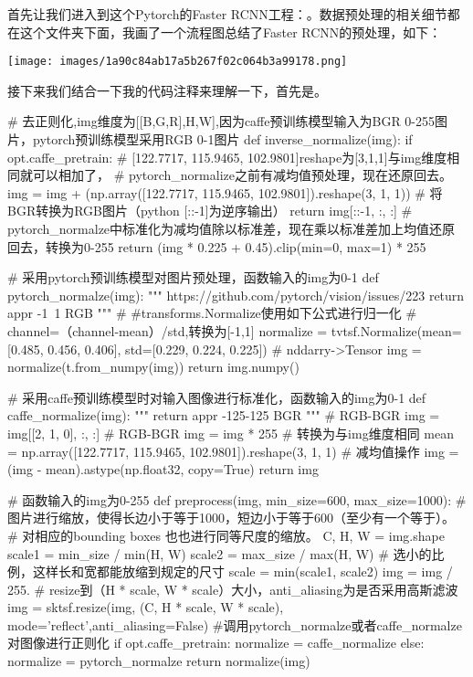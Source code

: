 \documentclass{article}
\begin{document}
首先让我们进入到这个Pytorch的Faster RCNN工程：。数据预处理的相关细节都在这个文件夹下面，我画了一个流程图总结了Faster RCNN的预处理，如下：




\begin{center}
\vspace{\baselineskip}\texttt{[image: images/1a90c84ab17a5b267f02c064b3a99178.png]}\vspace{\baselineskip}
\end{center}


接下来我们结合一下我的代码注释来理解一下，首先是。


\begin{langbox}[Py]
# 去正则化,img维度为[[B,G,R],H,W],因为caffe预训练模型输入为BGR 0-255图片，pytorch预训练模型采用RGB 0-1图片
def inverse_normalize(img):
    if opt.caffe_pretrain:
        # [122.7717, 115.9465, 102.9801]reshape为[3,1,1]与img维度相同就可以相加了，
        # pytorch_normalize之前有减均值预处理，现在还原回去。
        img = img + (np.array([122.7717, 115.9465, 102.9801]).reshape(3, 1, 1))
        # 将BGR转换为RGB图片（python [::-1]为逆序输出）
        return img[::-1, :, :]
    # pytorch_normalze中标准化为减均值除以标准差，现在乘以标准差加上均值还原回去，转换为0-255
    return (img * 0.225 + 0.45).clip(min=0, max=1) * 255

# 采用pytorch预训练模型对图片预处理，函数输入的img为0-1
def pytorch_normalze(img):
    """
    https://github.com/pytorch/vision/issues/223
    return appr -1~1 RGB
    """
    # #transforms.Normalize使用如下公式进行归一化
    # channel=（channel-mean）/std,转换为[-1,1]
    normalize = tvtsf.Normalize(mean=[0.485, 0.456, 0.406],
                                std=[0.229, 0.224, 0.225])
    # nddarry->Tensor
    img = normalize(t.from_numpy(img))
    return img.numpy()

# 采用caffe预训练模型时对输入图像进行标准化，函数输入的img为0-1
def caffe_normalize(img):
    """
    return appr -125-125 BGR
    """
    # RGB-BGR
    img = img[[2, 1, 0], :, :]  # RGB-BGR
    img = img * 255
    # 转换为与img维度相同
    mean = np.array([122.7717, 115.9465, 102.9801]).reshape(3, 1, 1)
    # 减均值操作
    img = (img - mean).astype(np.float32, copy=True)
    return img

# 函数输入的img为0-255
def preprocess(img, min_size=600, max_size=1000):
    # 图片进行缩放，使得长边小于等于1000，短边小于等于600（至少有一个等于）。
    # 对相应的bounding boxes 也也进行同等尺度的缩放。
    C, H, W = img.shape
    scale1 = min_size / min(H, W)
    scale2 = max_size / max(H, W)
    # 选小的比例，这样长和宽都能放缩到规定的尺寸
    scale = min(scale1, scale2)
    img = img / 255.
    # resize到（H * scale, W * scale）大小，anti_aliasing为是否采用高斯滤波
    img = sktsf.resize(img, (C, H * scale, W * scale), mode='reflect',anti_aliasing=False)
    #调用pytorch_normalze或者caffe_normalze对图像进行正则化
    if opt.caffe_pretrain:
        normalize = caffe_normalize
    else:
        normalize = pytorch_normalze
    return normalize(img)



\end{langbox}
\end{document}
